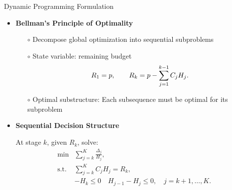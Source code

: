 \documentclass{beamer}
\begin{document}
\begin{frame}{Dynamic Programming Formulation}
\begin{itemize}[leftmargin=5pt] 
\item \textcolor{myblue3}{\bf Bellman's Principle of Optimality}
{\footnotesize
\begin{itemize}[leftmargin=15pt] 
\item[$\circ$] Decompose global optimization into sequential subproblems
\item[$\circ$] State variable: remaining budget 
\vspace{-3mm}
\[
R_1 = p, \qquad 
R_k = p - \sum_{j=1}^{k-1} C_j H_j.
\vspace{-3mm}
\]
\item[$\circ$] Optimal substructure: Each subsequence must be optimal for its subproblem
\end{itemize}
}


\vspace{2mm}
\item \textcolor{myblue3}{\bf Sequential Decision Structure}

{\footnotesize
At stage $k$, given $R_k$, solve:
\[
\begin{array}{ll}
\displaystyle 
\min & 
\displaystyle 
\sum_{j=k}^K \frac{\Delta_j}{H_j}, \\[1em]
\text{s.t.} &
\displaystyle \sum_{j=k}^K C_j H_j = R_k,\\[0.3em]
&-H_k\le 0 \quad H_{j-1}-H_j\le 0, \quad j=k+1,\ldots,K.
\end{array}
\]
}
\end{itemize}
\end{frame}
\end{document}
